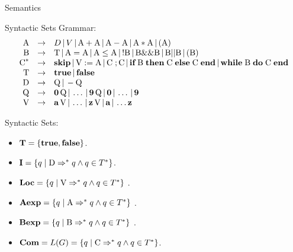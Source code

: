 \documentclass{beamer}
\begin{document}
\begin{frame}{Semantics}
\begin{frame}{Syntactic Sets}
Grammar:
\[
\begin{array}{rcl}
\mbox{A} &\rightarrow& D \,|\, V \,|\, \mbox{A} +\mbox{A} \,|\, \mbox{A} - \mbox{A} \,|\,
	\mbox{A} * \mbox{A}\,|\, ( \mbox{A} )\\

\mbox{B} &\rightarrow& \mbox{T}  \,|\, \mbox{A} = \mbox{A} \,|\,
	\mbox{A} \le \mbox{A} \,|\, ! \mbox{B} \,|\, \mbox{B} \&\& \mbox{B} \,|\,
	\mbox{B} || \mbox{B} \,|\, (\mbox{B})\\

\mbox{C}^* &\rightarrow& \mbox{\bf skip} \,|\, \mbox{V} := \mbox{A} \,|\,\mbox{C}\; ; \mbox{C} \,|\,
	\mbox{\bf if} \; \mbox{B}\; \mbox{\bf then}\;\mbox{C}\; \mbox{\bf else}\; \mbox{C} \; \mbox{\bf end}\,|\,
	\mbox{\bf while}\; \mbox{B}\; \mbox{\bf  do}\; \mbox{C}\; \mbox{\bf end}\\

\mbox{T} &\rightarrow& \mbox{\bf true} \,|\, \mbox{\bf false}\\

\mbox{D} &\rightarrow& \mbox{Q} \,|\, - \mbox{Q}\\

\mbox{Q} &\rightarrow& \mbox{\bf 0}\, \mbox{Q} \,|\, \ldots \,|\,  \mbox{\bf 9} \,\mbox{Q} \,|\, \mbox{\bf 0} \,|\, \ldots\,|\,\mbox{\bf 9}\\

\mbox{V} &\rightarrow& \mbox{\bf a}\,\mbox{V} \,|\, \ldots\,|\, \mbox{\bf z}\,\mbox{V} \,|\, \mbox{\bf a} \,|\, \ldots \mbox{\bf z}
\end{array}
\]

Syntactic Sets:
\begin{itemize}
\item $\mbox{\bf T} = \{  \mbox{\bf true} ,\mbox{\bf false} \}$.
\item $\mbox{\bf I} = \{ q \mid \mbox{D} \Rightarrow^* q \wedge q \in T^*\}$.
\item $\mbox{\bf Loc} = \{ q \mid \mbox{V} \Rightarrow^* q \wedge q \in T^*\}$ .
\item $\mbox{\bf Aexp} = \{ q \mid \mbox{A} \Rightarrow^* q \wedge q \in T^*\}$ .
\item $\mbox{\bf Bexp} = \{ q \mid \mbox{B} \Rightarrow^* q \wedge q \in T^*\}$ .
\item $\mbox{\bf Com} = L(G) = \{ q \mid \mbox{C} \Rightarrow^* q \wedge q \in T^*\}$.
\end{itemize}


\end{frame}
\end{frame}
\end{document}
